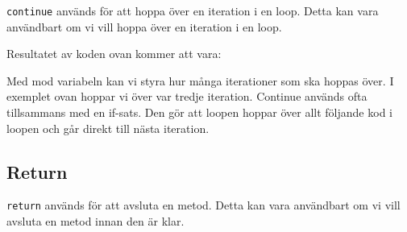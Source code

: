 \texttt{continue} används för att hoppa över en iteration i en loop.
Detta kan vara användbart om vi vill hoppa över en iteration i en loop.

\hypertarget{cb3}{}
\begin{Shaded}
\begin{Highlighting}[]
\OperatorTok{=}\OperatorTok{;}
\OperatorTok{(}\OperatorTok{=} \OperatorTok{;}\OperatorTok{\textless{}} \OperatorTok{;}\OperatorTok{++)} \OperatorTok{\{}
    \OperatorTok{(}\OperatorTok{\%}\OperatorTok{==} \OperatorTok{)} \OperatorTok{\{}
        \OperatorTok{;}
    \OperatorTok{\}}
    \OperatorTok{(}\OperatorTok{);}
\OperatorTok{\}}
\end{Highlighting}
\end{Shaded}

Resultatet av koden ovan kommer att vara:

\begin{Shaded}
\begin{Highlighting}[]
\end{Highlighting}
\end{Shaded}

Med mod variabeln kan vi styra hur många iterationer som ska hoppas
över. I exemplet ovan hoppar vi över var tredje iteration. Continue
används ofta tillsammans med en if-sats. Den gör att loopen hoppar över
allt följande kod i loopen och går direkt till nästa iteration.

\hypertarget{return}{%
\subsection{Return}\label{return}}

\texttt{return} används för att avsluta en metod. Detta kan vara
användbart om vi vill avsluta en metod innan den är klar.

